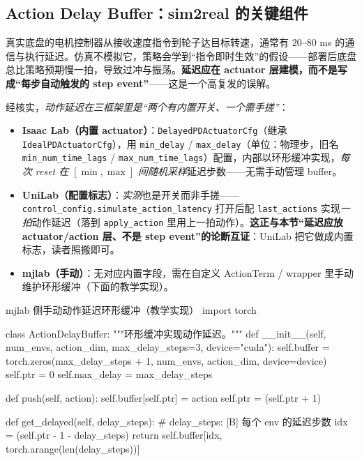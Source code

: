 \subsection{Action Delay Buffer：sim2real 的关键组件}
\label{sec:rlmc-wh-delay}

真实底盘的电机控制器从接收速度指令到轮子达目标转速，通常有 $20$--$80$ ms 的通信与执行延迟。仿真不模拟它，策略会学到“指令即时生效”的假设——部署后底盘总比策略预期慢一拍，导致过冲与振荡。\textbf{延迟应在 actuator 层建模，而不是写成“每步自动触发的 step event”}——这是一个高复发的误解。

\begin{note}[三框架动作延迟对照：Isaac=内置 actuator，UniLab=配置标志，mjlab=手动缓冲]
经核实，\emph{动作延迟在三框架里是“两个有内置开关、一个需手搓”}：
\begin{itemize}
\item \textbf{Isaac Lab（内置 actuator）}：\verb|DelayedPDActuatorCfg|（继承 \verb|IdealPDActuatorCfg|），用 \verb|min_delay| / \verb|max_delay|（单位：物理步，旧名 \verb|min_num_time_lags| / \verb|max_num_time_lags|）配置，内部以环形缓冲实现，\emph{每次 reset 在 $[\min,\max]$ 间随机采样}延迟步数——无需手动管理 buffer。
\item \textbf{UniLab（配置标志）}：\emph{实测}也是开关而非手搓——\verb|control_config.simulate_action_latency| 打开后配 \verb|last_actions| 实现\emph{一拍}动作延迟（落到 \verb|apply_action| 里用上一拍动作）。\textbf{这正与本节“延迟应放 actuator/action 层、不是 step event”的论断互证}：UniLab 把它做成内置标志，读者照搬即可。
\item \textbf{mjlab（手动）}：无对应内置字段，需在自定义 ActionTerm / wrapper 里手动维护环形缓冲（下面的教学实现）。
\end{itemize}
\end{note}

\begin{codebox}[Python]{mjlab 侧手动动作延迟环形缓冲（教学实现）}
import torch

class ActionDelayBuffer:
    """环形缓冲实现动作延迟。"""
    def __init__(self, num_envs, action_dim, max_delay_steps=3, device="cuda"):
        self.buffer = torch.zeros(max_delay_steps + 1, num_envs, action_dim, device=device)
        self.ptr = 0
        self.max_delay = max_delay_steps

    def push(self, action):
        self.buffer[self.ptr] = action
        self.ptr = (self.ptr + 1) %

    def get_delayed(self, delay_steps):       # delay_steps: [B] 每个 env 的延迟步数
        idx = (self.ptr - 1 - delay_steps) %
        return self.buffer[idx, torch.arange(len(delay_steps))]
\end{codebox}

